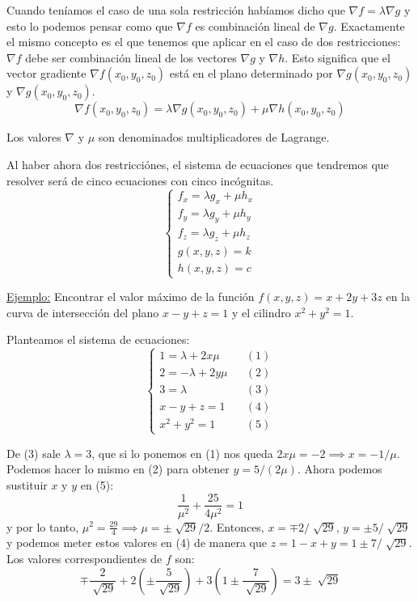 \documentclass[12pt]{article}
\begin{document}
Cuando teníamos el caso de una sola restricción habíamos dicho que $ \nabla f=\lambda \nabla g $ y esto lo podemos pensar como que $ \nabla f $ es combinación lineal de $ \nabla g $. Exactamente el mismo concepto es el que tenemos que aplicar en el caso de dos restricciones: $ \nabla f $ debe ser combinación lineal de los vectores $ \nabla g $ y $ \nabla h $. Esto significa que el vector gradiente $ \nabla f(x_{0},y_{0},z_{0}) $ está en el plano determinado por $ \nabla g(x_{0},y_{0},z_{0}) $ y $  \nabla g(x_{0},y_{0},z_{0})  $.
\[
	\boxed{\nabla f(x_{0},y_{0},z_{0})=\lambda \nabla g(x_{0},y_{0},z_{0}) + \mu \nabla h(x_{0},y_{0},z_{0})} 
\]

Los valores $ \nabla $ y $ \mu $ son denominados multiplicadores de Lagrange.

Al haber ahora dos restricciónes, el sistema de ecuaciones que tendremos que resolver será de cinco ecuaciones con cinco incógnitas.
\[
  \left\{
  \begin{aligned}
    f_{x}=\lambda g_{x} + \mu h_{x} \\
    f_{y}=\lambda g_{y} + \mu h_{y} \\
    f_{z}=\lambda g_{z} + \mu h_{z} \\
    g(x,y,z)=k \\
    h(x,y,z)=c
  \end{aligned}
  \right.
\]

\underline{Ejemplo:} Encontrar el valor máximo de la función $ f(x,y,z)=x+2y+3z $ en la curva de intersección del plano $ x-y+z=1 $ y el cilindro $ x^2+y^2=1 $.

Planteamos el sistema de ecuaciones:
\[
  \left\{
  \begin{aligned}
	  1 = \lambda + 2x\mu &&(1) \\
	  2 = -\lambda + 2y\mu &&(2) \\
	  3 = \lambda &&(3) \\
	  x-y+z=1 &&(4) \\
	  x^2 + y^2 = 1 &&(5)
  \end{aligned}
  \right.
\]

De (3) sale $ \lambda = 3 $, que si lo ponemos en (1) nos queda $ 2x\mu = -2 \implies x=-1/\mu $. Podemos hacer lo mismo en (2) para obtener $ y=5/(2\mu) $. Ahora podemos sustituir $ x $ y $ y $ en (5):
\[
  \frac{1}{\mu^2} + \frac{25}{4\mu^2} = 1
\]
y por lo tanto, $ \mu^2=\frac{29}{4} \implies \mu=\pm \sqrt[]{29}/2 $. Entonces, $ x=\mp 2/\sqrt[]{29} $, $ y=\pm 5/\sqrt[]{29} $ y podemos meter estos valores en (4) de manera que $ z=1-x+y=1\pm 7/\sqrt[]{29} $. Los valores correspondientes de $ f $ son:
\[
  \mp \frac{2}{\sqrt[]{29}}+2\left(\pm\frac{5}{\sqrt[]{29}}\right)+3\left(1\pm\frac{7}{\sqrt[]{29}}\right)=3\pm \sqrt[]{29}
\]
\end{document}
